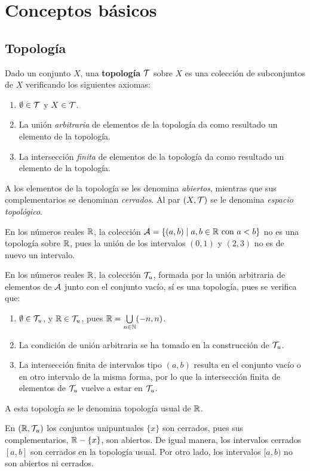 \section*{Conceptos básicos}

\subsection*{Topología}

\begin{deff}
    Dado un conjunto $X$, una {\bf topología} $\mathcal{T}$ sobre $X$ es una colección de subconjuntos de $X$ verificando los siguientes axiomas:

    \begin{enumerate}[leftmargin=15pt,itemsep=0pt, topsep=5pt]
        \item $\emptyset \in \mathcal{T}$ y $X \in \mathcal{T}$.
        \item La unión {\it arbitraria} de elementos de la topología da como resultado un elemento de la topología.
        \item La intersección {\it finita} de elementos de la topología da como resultado un elemento de la topología.
    \end{enumerate}
\end{deff}

A los elementos de la topología se les denomina {\it abiertos}, mientras que sus complementarios se denominan \textit{cerrados}. Al par $(X,\mathcal{T})$ se le denomina {\it espacio topológico}.

\begin{ejs}
    \item En los números reales $\mathbb{R}$, la colección $\mathcal{A} = \{(a,b) \mid a,b \in \mathbb{R} \text{ con } a < b\}$ no es una topología sobre $\mathbb{R}$, pues la unión de los intervalos $(0,1)$ y $(2,3)$ no es de nuevo un intervalo.
    \item En los números reales $\mathbb{R}$, la colección $\mathcal{T}_u$, formada por la unión arbitraria de elementos de $\mathcal{A}$ junto con el conjunto vacío, sí es una topología, pues se verifica que:
    \begin{enumerate}[itemsep=0pt]
        \item $\emptyset \in \mathcal{T}_u$, y $\mathbb{R}\in\mathcal{T}_u$, pues $\mathbb{R} = \bigcup\limits_{n \in \mathbb{N}}(-n,n)$.
        \item La condición de unión arbitraria se ha tomado en la construcción de $\mathcal{T}_u$.
        \item La intersección finita de intervalos tipo $(a,b)$ resulta en el conjunto vacío o en otro intervalo de la misma forma, por lo que la intersección finita de elementos de $\mathcal{T}_u$ vuelve a estar en $\mathcal{T}_u$.
    \end{enumerate}
    A esta topología se le denomina topología usual de $\mathbb{R}$.
    \item En $(\mathbb{R},\mathcal{T}_u)$ los conjuntos unipuntuales $\{x\}$ son cerrados, pues sus complementarios, $\mathbb{R} - \{x\}$, son abiertos. De igual manera, los intervalos cerrados $[a,b]$ son cerrados en la topología usual. Por otro lado, los intervalos $[a,b)$ no son abiertos ni cerrados.
\end{ejs}


